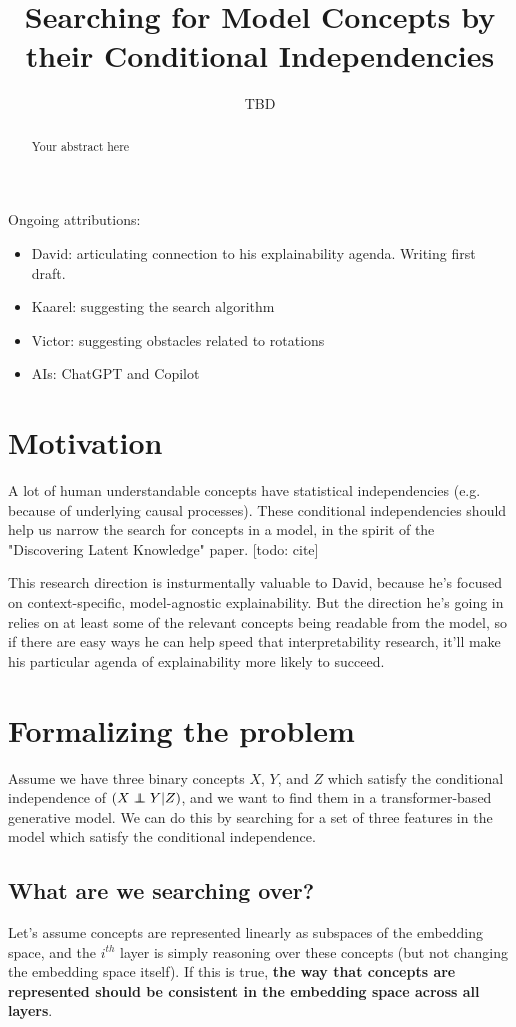 \documentclass{article}
\title{Searching for Model Concepts by their Conditional Independencies}
\date{}
\author{TBD}
\begin{document}
\maketitle

\begin{abstract}
Your abstract here
\end{abstract}

Ongoing attributions:
\begin{itemize}
    \item David: articulating connection to his explainability agenda. Writing first draft.
    \item Kaarel: suggesting the search algorithm
    \item Victor: suggesting obstacles related to rotations
    \item AIs: ChatGPT and Copilot
\end{itemize}

\section{Motivation}
A lot of human understandable concepts have statistical independencies (e.g. because of underlying causal processes). These conditional independencies should help us narrow the search for concepts in a model, in the spirit of the "Discovering Latent Knowledge" paper. [todo: cite]

This research direction is insturmentally valuable to David, because he's focused on context-specific, model-agnostic explainability. But the direction he's going in relies on at least some of the relevant concepts being readable from the model, so if there are easy ways he can help speed that interpretability research, it'll make his particular agenda of explainability more likely to succeed.

\section{Formalizing the problem}
Assume we have three binary concepts $X$, $Y$, and $Z$ which satisfy the conditional independence of $(X\independent Y|Z)$, and we want to find them in a transformer-based generative model. We can do this by searching for a set of three features in the model which satisfy the conditional independence. 

\subsection{What are we searching over?}
Let's assume concepts are represented linearly as subspaces of the embedding space, and the $i^{th}$ layer is simply reasoning over these concepts (but not changing the embedding space itself). If this is true, \textbf{the way that concepts are represented should be consistent in the embedding space across all layers}. 
\end{document}
